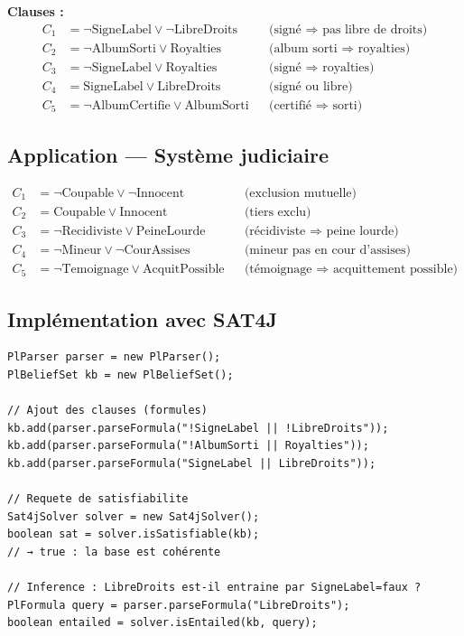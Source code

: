 \noindent\textbf{Clauses :}
\begin{align*}
C_1 &= \lnot\text{SigneLabel} \lor \lnot\text{LibreDroits}
    && \text{(signé $\Rightarrow$ pas libre de droits)} \\
C_2 &= \lnot\text{AlbumSorti} \lor \text{Royalties}
    && \text{(album sorti $\Rightarrow$ royalties)} \\
C_3 &= \lnot\text{SigneLabel} \lor \text{Royalties}
    && \text{(signé $\Rightarrow$ royalties)} \\
C_4 &= \text{SigneLabel} \lor \text{LibreDroits}
    && \text{(signé ou libre)} \\
C_5 &= \lnot\text{AlbumCertifie} \lor \text{AlbumSorti}
    && \text{(certifié $\Rightarrow$ sorti)}
\end{align*}

\subsection{Application — Système judiciaire}

\begin{align*}
C_1 &= \lnot\text{Coupable} \lor \lnot\text{Innocent}
    && \text{(exclusion mutuelle)} \\
C_2 &= \text{Coupable} \lor \text{Innocent}
    && \text{(tiers exclu)} \\
C_3 &= \lnot\text{Recidiviste} \lor \text{PeineLourde}
    && \text{(récidiviste $\Rightarrow$ peine lourde)} \\
C_4 &= \lnot\text{Mineur} \lor \lnot\text{CourAssises}
    && \text{(mineur pas en cour d'assises)} \\
C_5 &= \lnot\text{Temoignage} \lor \text{AcquitPossible}
    && \text{(témoignage $\Rightarrow$ acquittement possible)}
\end{align*}

\subsection{Implémentation avec SAT4J}

\begin{lstlisting}[caption={Résolution SAT propositionnelle via Tweety}]
PlParser parser = new PlParser();
PlBeliefSet kb = new PlBeliefSet();

// Ajout des clauses (formules)
kb.add(parser.parseFormula("!SigneLabel || !LibreDroits"));
kb.add(parser.parseFormula("!AlbumSorti || Royalties"));
kb.add(parser.parseFormula("SigneLabel || LibreDroits"));

// Requete de satisfiabilite
Sat4jSolver solver = new Sat4jSolver();
boolean sat = solver.isSatisfiable(kb);
// → true : la base est cohérente

// Inference : LibreDroits est-il entraine par SigneLabel=faux ?
PlFormula query = parser.parseFormula("LibreDroits");
boolean entailed = solver.isEntailed(kb, query);
\end{lstlisting}

